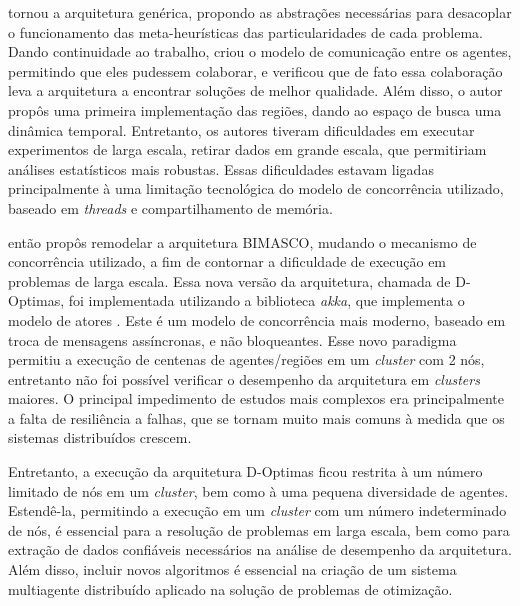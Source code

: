  tornou a arquitetura genérica, propondo as abstrações necessárias para desacoplar o funcionamento das meta-heurísticas das particularidades de cada problema. Dando continuidade ao trabalho,  criou o modelo de comunicação entre os agentes, permitindo que eles pudessem colaborar, e verificou que de fato essa colaboração leva a arquitetura a encontrar soluções de melhor qualidade. Além disso, o autor propôs uma primeira implementação das regiões, dando ao espaço de busca uma dinâmica temporal. Entretanto, os autores tiveram dificuldades em executar experimentos de larga escala, retirar dados em grande escala, que permitiriam análises estatísticos mais robustas. Essas dificuldades estavam ligadas principalmente à uma limitação tecnológica do modelo de concorrência utilizado, baseado em \textit{threads} e compartilhamento de memória. 

 então propôs remodelar a arquitetura BIMASCO, mudando o mecanismo de concorrência utilizado, a fim de contornar a dificuldade de execução em problemas de larga escala. Essa nova versão da arquitetura, chamada de D-Optimas, foi implementada utilizando a biblioteca \textit{akka}, que implementa o modelo de atores \cite{hewitt2013}. Este é um modelo de concorrência mais moderno, baseado em troca de mensagens assíncronas, e não bloqueantes. Esse novo paradigma permitiu a execução de centenas de  agentes/regiões em um \textit{cluster} com 2 nós, entretanto não foi possível verificar o desempenho da arquitetura em \textit{clusters} maiores. O principal impedimento de estudos mais complexos era principalmente a falta de resiliência a falhas, que se tornam muito mais comuns à medida que os sistemas distribuídos crescem.


Entretanto, a execução da arquitetura D-Optimas ficou restrita à um número limitado de nós em um \textit{cluster}, bem como à uma pequena diversidade de agentes. Estendê-la, permitindo a execução em um \textit{cluster} com um número indeterminado de nós, é essencial para a resolução de problemas em larga escala, bem como para extração de dados confiáveis necessários na análise de desempenho da arquitetura. Além disso, incluir novos algoritmos é essencial na criação de um sistema multiagente distribuído aplicado na solução de problemas de otimização. 

